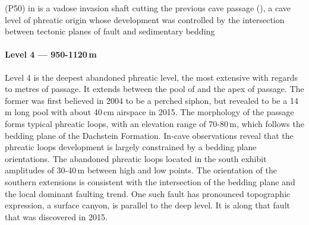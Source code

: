 \begin{pagefigure}
\caption{ (P50) in  is a vadose invasion shaft cutting the previous cave passage (), a cave level of phreatic origin whose development was controlled by the intersection between tectonic planes of fault and sedimentary bedding }\label{fig:zimmer}
\end{pagefigure}

\paragraph{Level 4 — 950-1120\,m}
Level 4 is the deepest abandoned phreatic level, the most extensive with regards to metres of passage. 
It extends between the pool of  and the apex of  passage. 
The former was first believed in 2004 to be a perched siphon, but revealed to be a 14\,m long pool with about 40\,cm airspace in 2015. 
The morphology of the passage forms typical phreatic loops, with an elevation range of 70-80\,m, which follows the bedding plane of the Dachstein Formation.
In-cave observations reveal that the phreatic loops development is largely constrained by a bedding plane orientations.
The abandoned phreatic loops located in the south exhibit amplitudes of 30-40\,m between high and low points. 
The orientation of the southern extensions is consistent with the intersection of the bedding plane and the local dominant faulting trend. 
One such fault has pronounced topographic expression, a surface canyon, is parallel to the deep  level. 
It is along that fault that  was discovered in 2015. 

